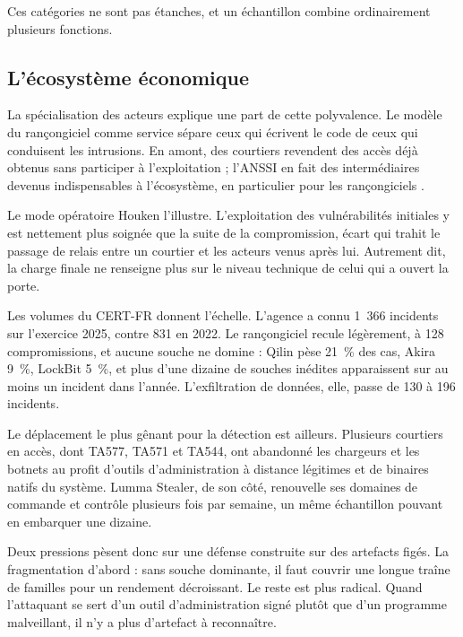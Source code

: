 Ces catégories ne sont pas étanches, et un échantillon combine ordinairement plusieurs fonctions.

\subsection{L'écosystème économique}
\label{sec:economie}

La spécialisation des acteurs explique une part de cette polyvalence. Le modèle du
rançongiciel comme service sépare ceux qui écrivent le code de ceux qui conduisent
les intrusions. En amont, des courtiers revendent des accès déjà obtenus sans
participer à l'exploitation ; l'ANSSI en fait des intermédiaires devenus
indispensables à l'écosystème, en particulier pour les rançongiciels
\cite{anssiPanorama}.

Le mode opératoire Houken l'illustre. L'exploitation des vulnérabilités initiales y
est nettement plus soignée que la suite de la compromission, écart qui trahit le
passage de relais entre un courtier et les acteurs venus après lui. Autrement dit,
la charge finale ne renseigne plus sur le niveau technique de celui qui a ouvert la
porte.

Les volumes du CERT-FR donnent l'échelle. L'agence a connu 1~366 incidents sur
l'exercice 2025, contre 831 en 2022. Le rançongiciel recule légèrement, à 128
compromissions, et aucune souche ne domine : Qilin pèse 21~\% des cas, Akira 9~\%,
LockBit 5~\%, et plus d'une dizaine de souches inédites apparaissent sur au moins un
incident dans l'année. L'exfiltration de données, elle, passe de 130 à 196
incidents\cite{anssiPanorama}.

Le déplacement le plus gênant pour la détection est ailleurs. Plusieurs courtiers en
accès, dont TA577, TA571 et TA544, ont abandonné les chargeurs et les botnets au
profit d'outils d'administration à distance légitimes et de binaires natifs du
système. Lumma Stealer, de son côté, renouvelle ses domaines de commande et contrôle
plusieurs fois par semaine, un même échantillon pouvant en embarquer une dizaine.

Deux pressions pèsent donc sur une défense construite sur des artefacts figés. La
fragmentation d'abord : sans souche dominante, il faut couvrir une longue traîne de
familles pour un rendement décroissant. Le reste est plus radical. Quand
l'attaquant se sert d'un outil d'administration signé plutôt que d'un programme
malveillant, il n'y a plus d'artefact à reconnaître.

